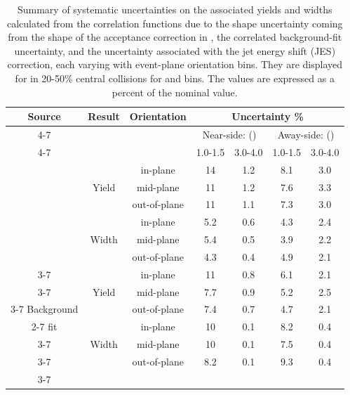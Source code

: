 \begin{table}[!htbp]
	\caption{Summary of systematic uncertainties on the associated yields and widths calculated from the correlation functions due to the shape uncertainty coming from the shape of the acceptance correction in \deta, the correlated background-fit uncertainty, and the uncertainty associated with the jet energy shift (JES) correction, each varying with event-plane orientation bins.  They are displayed for  in 20-50\% central \AuAu collisions for  and  bins.  The values are expressed as a percent of the nominal value.}
	\label{Tab:SystematicSummaryEPdep}
	\centering
	\begin{tabular}{c | c | c | c | c | c | c}\hline
		\multirow{3}{*}{Source} & \multirow{3}{*}{Result} & \multirow{3}{*}{Orientation} & \multicolumn{4}{c}{Uncertainty \%} \\ \cline{4-7}
		&   &      & \multicolumn{2}{c|}{Near-side: \Pt{assoc} (\GeVc)} & \multicolumn{2}{c}{Away-side: \Pt{assoc} (\GeVc)} \Bstrut \\ \cline{4-7}     
		&   &      & 1.0-1.5 & 3.0-4.0 & 1.0-1.5 & 3.0-4.0 \\ \hline       
		
		\multirow{6}{*}{} & \multirow{3}{*}{Yield} & in-plane & 14 & 1.2 & 8.1 & 3.0  \\ \cline{3-7}
		& & mid-plane & 11 & 1.2 & 7.6 & 3.3 \\ \cline{3-7}
		Acceptance & & out-of-plane & 11 & 1.1 & 7.3 & 3.0 \\ \cline{2-7}
		shape & \multirow{3}{*}{Width} & in-plane & 5.2 & 0.6 & 4.3 & 2.4 \\ \cline{3-7}
		& & mid-plane    & 5.4 & 0.5 & 3.9 & 2.2 \\ \cline{3-7}
		& & out-of-plane & 4.3 & 0.4 & 4.9 & 2.1 \\ \cline{3-7}
		\hline
		
		\multirow{6}{*}{} & \multirow{3}{*}{Yield} & in-plane & 11 & 0.8 & 6.1 & 2.1 \\ \cline{3-7}
		& & mid-plane & 7.7 & 0.9 & 5.2 & 2.5 \\ \cline{3-7}
		Background & & out-of-plane & 7.4 & 0.7 & 4.7 & 2.1  \\ \cline{2-7}
		fit & \multirow{3}{*}{Width} & in-plane & 10 & 0.1 & 8.2 & 0.4 \\ \cline{3-7}
		& & mid-plane    & 10 & 0.1 & 7.5 & 0.4 \\ \cline{3-7}
		& & out-of-plane & 8.2 & 0.1 & 9.3 & 0.4 \\ \cline{3-7}
		\hline
		

\end{tabular}
\end{table}
